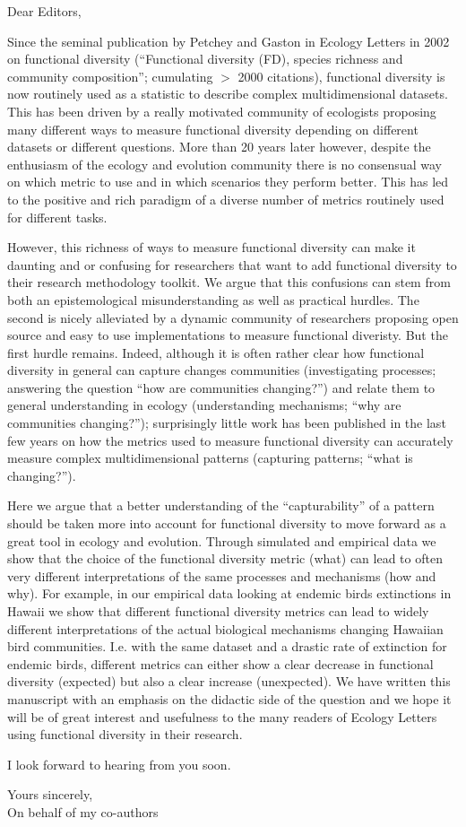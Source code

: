 \documentclass[11pt]{letter}
\begin{document}
\begin{letter}{}
\opening{Dear Editors,}

Since the seminal publication by Petchey and Gaston in Ecology Letters in 2002 on functional diversity (``Functional diversity (FD), species richness and community composition''; cumulating $>$ 2000 citations), functional diversity is now routinely used as a statistic to describe complex multidimensional datasets.
This has been driven by a really motivated community of ecologists proposing many different ways to measure functional diversity depending on different datasets or different questions.
More than 20 years later however, despite the enthusiasm of the ecology and evolution community there is no consensual way on which metric to use and in which scenarios they perform better.
This has led to the positive and rich paradigm of a diverse number of metrics routinely used for different tasks.

However, this richness of ways to measure functional diversity can make it daunting and or confusing for researchers that want to add functional diversity to their research methodology toolkit.
We argue that this confusions can stem from both an epistemological misunderstanding as well as practical hurdles.
The second is nicely alleviated by a dynamic community of researchers proposing open source and easy to use implementations to measure functional diveristy.
But the first hurdle remains.
Indeed, although it is often rather clear how functional diversity in general can capture changes communities (investigating processes; answering the question ``how are communities changing?'') and relate them to general understanding in ecology (understanding mechanisms; ``why are communities changing?''); surprisingly little work has been published in the last few years on how the metrics used to measure functional diversity can accurately measure complex multidimensional patterns (capturing patterns; ``what is changing?'').

Here we argue that a better understanding of the ``capturability'' of a pattern should be taken more into account for functional diversity to move forward as a great tool in ecology and evolution.
Through simulated and empirical data we show that the choice of the functional diversity metric (what) can lead to often very different interpretations of the same processes and mechanisms (how and why).
For example, in our empirical data looking at endemic birds extinctions in Hawaii we show that different functional diversity metrics can lead to widely different interpretations of the actual biological mechanisms changing Hawaiian bird communities.
I.e. with the same dataset and a drastic rate of extinction for endemic birds, different metrics can either show a clear decrease in functional diversity (expected) but also a clear increase (unexpected).
We have written this manuscript with an emphasis on the didactic side of the question and we hope it will be of great interest and usefulness to the many readers of Ecology Letters using functional diversity in their research.

I look forward to hearing from you soon.

\closing{Yours sincerely,\\On behalf of my co-authors}

\end{letter}
\end{document}
